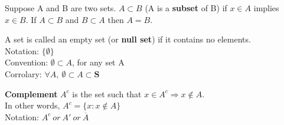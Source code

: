\documentclass[12pt, oneside, letterpaper]{notes}
\begin{document}
\begin{mydef}
  Suppose A and B are two sets.  $A \subset B$ (A is a 
  \textbf{subset} of B) if $x \in A$ implies $x \in B$. 
  If $A \subset B$ and $B \subset A$ then $A=B$.
\end{mydef}

\begin{mydef}
  A set is called an empty set (or \textbf{null set}) if it contains no elements.\\
  \indent Notation: $\{ \emptyset \}$ \\
  \indent Convention: $\emptyset \subset A$, for any set A \\
  \indent Corrolary: $\forall A, \: \emptyset \subset A \subset \textbf{S}$
\end{mydef}

\begin{mydef}
  \textbf{Complement} $A^c$ is the set such that $x \in A^c \Rightarrow x \notin A$.\\
  \indent In other words, $A^c = \{ x : x \notin A \}$ \\
  \indent Notation: $A^c \: or \: A' \: or \: \overline{A}$
\end{mydef}
\end{document}

